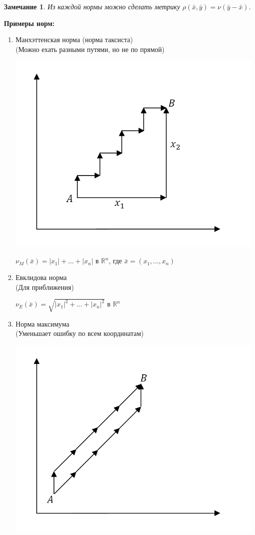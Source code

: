 \documentclass[12pt]{article}
\newtheorem*{notice}{Замечание}
\begin{document}
	\begin{notice}Из каждой нормы можно сделать метрику $\rho(\bar x, \bar y) = \nu(\bar y - \bar x)$.
	\end{notice}
	\textbf{Примеры норм:}\begin{enumerate}
		\item Манхэттенская норма (норма таксиста)\\
		(Можно ехать разными путями, но не по прямой)\begin{center}
			\includegraphics[scale=0.4]{l4_7.png}\end{center}
		\begin{center}$\nu_M(\bar x) = |x_1|+...+|x_n|$ в $\mathbb{R}^n$, где $\bar x = (x_1,..., x_n)$\end{center}
		\item Евклидова норма\\
		(Для приближения)
		\begin{center}
			$\nu_E(\bar x) = \sqrt{|x_1|^2+...+|x_n|^2}$ в $\mathbb{R}^n$\end{center}
		\item Норма максимума\\
		(Уменьшает ошибку по всем координатам)\begin{center}
			\includegraphics[scale=0.4]{l4_8.png}\end{center}

\end{enumerate}
\end{document}
